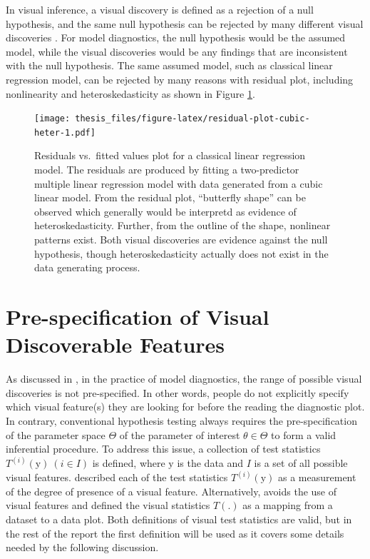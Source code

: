 \documentclass{monashthesis}
\theoremstyle{definition}
\theoremstyle{definition}
\theoremstyle{definition}
\theoremstyle{definition}
\theoremstyle{remark}
\begin{document}
In visual inference, a visual discovery is defined as a rejection of a null hypothesis, and the same null hypothesis can be rejected by many different visual discoveries \autocite{buja_statistical_2009}. For model diagnostics, the null hypothesis would be the assumed model, while the visual discoveries would be any findings that are inconsistent with the null hypothesis. The same assumed model, such as classical linear regression model, can be rejected by many reasons with residual plot, including nonlinearity and heteroskedasticity as shown in Figure \ref{fig:residual-plot-cubic-heter}.

\begin{figure}
\centering
\texttt{[image: thesis\_files/figure-latex/residual-plot-cubic-heter-1.pdf]}
\caption{\label{fig:residual-plot-cubic-heter}Residuals vs.~fitted values plot for a classical linear regression model. The residuals are produced by fitting a two-predictor multiple linear regression model with data generated from a cubic linear model. From the residual plot, ``butterfly shape'' can be observed which generally would be interpretd as evidence of heteroskedasticity. Further, from the outline of the shape, nonlinear patterns exist. Both visual discoveries are evidence against the null hypothesis, though heteroskedasticity actually does not exist in the data generating process.}
\end{figure}

\hypertarget{se:prespecification}{%
\section{Pre-specification of Visual Discoverable Features}\label{se:prespecification}}

As discussed in \textcite{buja_statistical_2009}, in the practice of model diagnostics, the range of possible visual discoveries is not pre-specified. In other words, people do not explicitly specify which visual feature(s) they are looking for before the reading the diagnostic plot. In contrary, conventional hypothesis testing always requires the pre-specification of the parameter space \(\Theta\) of the parameter of interest \(\theta \in \Theta\) to form a valid inferential procedure. To address this issue, a collection of test statistics \(T^{(i)}(\boldsymbol{\mathrm{y}})~(i \in I)\) is defined, where \(\boldsymbol{\mathrm{y}}\) is the data and \(I\) is a set of all possible visual features. \textcite{buja_statistical_2009} described each of the test statistics \(T^{(i)}(\boldsymbol{\mathrm{y}})\) as a measurement of the degree of presence of a visual feature. Alternatively, \textcite{majumder_validation_2013} avoids the use of visual features and defined the visual statistics \(T(.)\) as a mapping from a dataset to a data plot. Both definitions of visual test statistics are valid, but in the rest of the report the first definition will be used as it covers some details needed by the following discussion.
\end{document}
